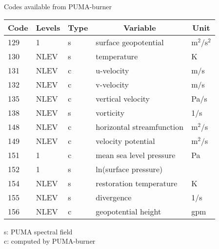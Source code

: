 \begin{table}[h]
Codes available from PUMA-burner \\

\begin{tabular}[t]{|l|l|l|l|l|} \hline
\multicolumn{1}{|c|}{Code} &
\multicolumn{1}{c|}{Levels}&
\multicolumn{1}{c|}{Type} &
\multicolumn{1}{c|}{Variable} &
\multicolumn{1}{c|}{Unit} \\ \hline \hline

129 & 1    & s  & surface geopotential             & m$^{2}$/s$^{2}$ \\ \hline
130 & NLEV & s  & temperature                      & K               \\ \hline
131 & NLEV & c  & u-velocity                       & m/s             \\ \hline
132 & NLEV & c  & v-velocity                       & m/s             \\ \hline
135 & NLEV & c  & vertical velocity                & Pa/s            \\ \hline
138 & NLEV & s  & vorticity                        & 1/s             \\ \hline
148 & NLEV & c  & horizontal streamfunction        & m$^{2}$/s       \\ \hline
149 & NLEV & c  & velocity potential               & m$^{2}$/s       \\ \hline
151 & 1    & c  & mean sea level pressure          & Pa              \\ \hline
152 & 1    & s  & ln(surface pressure)             &                 \\ \hline
154 & NLEV & s  & restoration temperature          & K               \\ \hline
155 & NLEV & s  & divergence                       & 1/s             \\ \hline
156 & NLEV & c  & geopotential height              & gpm             \\ \hline
\end{tabular}

\vspace*{0.5cm}

s: PUMA spectral field \\
c: computed by PUMA-burner \\

\end{table}
